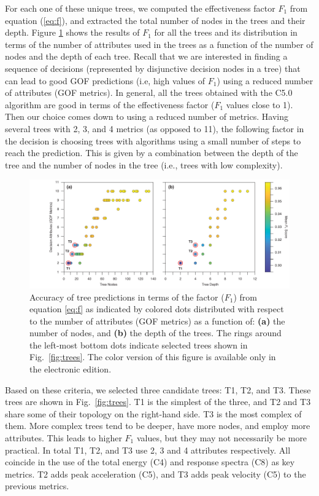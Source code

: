 For each one of these unique trees, we computed the effectiveness factor $F_1$ from equation (\ref{eq:f}), and extracted the total number of nodes in the trees and their depth. Figure \ref{fig:nodes-depth} shows the results of $F_1$ for all the trees and its distribution in terms of the number of attributes used in the trees as a function of the number of nodes and the depth of each tree. Recall that we are interested in finding a sequence of decisions (represented by disjunctive decision nodes in a tree) that can lead to good GOF predictions (i.e, high values of $F_1$) using a reduced number of attributes (GOF metrics). In general, all the trees obtained with the C5.0 algorithm are good in terms of the effectiveness factor ($F_1$ values close to 1). Then our choice comes down to using a reduced number of metrics. Having several trees with 2, 3, and 4 metrics (as opposed to 11), the following factor in the decision is choosing trees with algorithms using a small number of steps to reach the prediction. This is given by a combination between the depth of the tree and the number of nodes in the tree (i.e., trees with low complexity).

\begin{figure}[t]
	\centering
	\includegraphics[width=\textwidth]{figures/pdf/figure-08}
	\caption{Accuracy of tree predictions in terms of the factor ($F_1$) from equation \ref{eq:f} as indicated by colored dots distributed with respect to the number of attributes (GOF metrics) as a function of: \textbf{(a)} the number of nodes, and \textbf{(b)} the depth of the trees. The rings around the left-most bottom dots indicate selected trees shown in Fig.~\ref{fig:trees}. The color version of this figure is available only in the electronic edition.}
	\label{fig:nodes-depth}
\end{figure}

Based on these criteria, we selected three candidate trees: T1, T2, and T3. These trees are shown in Fig.~\ref{fig:trees}. T1 is the simplest of the three, and T2 and T3 share some of their topology on the right-hand side. T3 is the most complex of them. More complex trees tend to be deeper, have more nodes, and employ more attributes. This leads to higher $F_1$ values, but they may not necessarily be more practical. In total T1, T2, and T3 use 2, 3 and 4 attributes respectively. All coincide in the use of the total energy (C4) and response spectra (C8) as key metrics. T2 adds peak acceleration (C5), and T3 adds peak velocity (C5) to the previous metrics.

